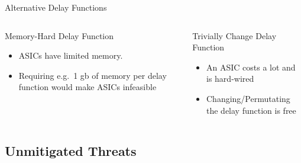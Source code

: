 \begin{frame}{Alternative Delay Functions}
    \centering
    \begin{columns}[T, onlytextwidth]
        \begin{block}{Memory-Hard Delay Function}
            \begin{itemize}
                \item ASICs have limited memory.
                \item Requiring e.g.\ 1 gb of memory per delay function would make ASICs infeasible
            \end{itemize}
        \end{block}

        \begin{block}{Trivially Change Delay Function}
            \begin{itemize}
                \item An ASIC costs a lot and is hard-wired
                \item Changing/Permutating the delay function is free
            \end{itemize}
        \end{block}
    \end{columns}
\end{frame}


\subsection{Unmitigated Threats}

